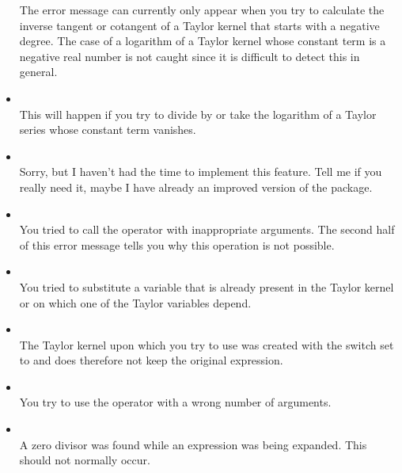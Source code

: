 \begin{itemize}
    The error message can currently only appear when you try to
    calculate the inverse tangent or cotangent of a Taylor
    kernel that starts with a negative degree.
    The case of a logarithm of a Taylor kernel whose constant term
    is a negative real number is not caught since it is
    difficult to detect this in general.

\item {}\\
    This will happen if you try to divide by or take the logarithm of 
    a Taylor series whose constant term vanishes.

\item {}\\
    Sorry, but I haven't had the time to implement this feature.
    Tell me if you really need it, maybe I have already an improved
    version of the package.

\item {}\\
    You tried to call the  operator with
    inappropriate arguments. The second half of this error message
    tells you why this operation is not possible.

\item {}\\
    You tried to substitute a variable that is already present in the
    Taylor kernel or on which one of the Taylor variables depend.

\item {}\\
 
    The Taylor kernel upon which you try to use 
    was created with the switch 
    set to 
    and does therefore not keep the original expression.

\item {}\\
    You try to use the operator  with a wrong number of
    arguments.

\item {}\\
    A zero divisor was found while an expression was being expanded.
    This should not normally occur.


\end{itemize}
